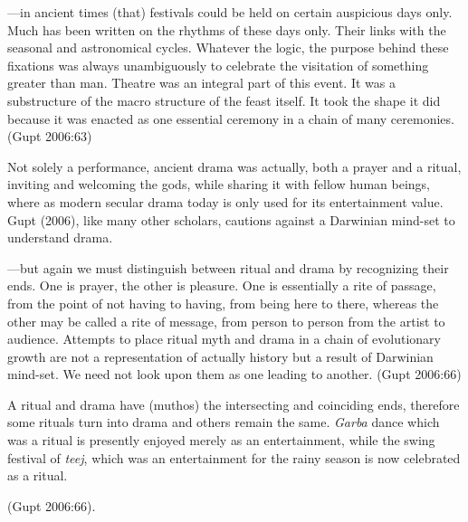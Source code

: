 \begin{myquote}
---in ancient times (that) festivals could be held on certain auspicious days only. Much has been written on the rhythms of these days only. Their links with the seasonal and astronomical cycles. Whatever the logic, the purpose behind these fixations was always unambiguously to celebrate the visitation of something greater than man. Theatre was an integral part of this event. It was a substructure of the macro structure of the feast itself. It took the shape it did because it was enacted as one essential ceremony in a chain of many ceremonies. 
\hfill (Gupt 2006:63)
\end{myquote}

Not solely a performance, ancient drama was actually, both a prayer and a ritual, inviting and welcoming the gods, while sharing it with fellow human beings, where as modern secular drama today is only used for its entertainment value. Gupt (2006), like many other scholars, cautions against a Darwinian mind-set to understand drama. 

\begin{myquote}
---but again we must distinguish between ritual and drama by recognizing their ends. One is prayer, the other is pleasure. One is essentially a rite of passage, from the point of not having to having, from being here to there, whereas the other may be called a rite of message, from person to person from the artist to audience. Attempts to place ritual myth and drama in a chain of evolutionary growth are not a representation of actually history but a result of Darwinian mind-set. We need not look upon them as one leading to another.
\hfill(Gupt 2006:66)
\end{myquote}

\begin{myquote}
A ritual and drama have (muthos) the intersecting and coinciding ends, therefore some rituals turn into drama and others remain the same. \textsl{Garba} dance which was a ritual is presently enjoyed merely as an entertainment, while the swing festival of \textsl{teej}, which was an entertainment for the rainy season is now celebrated as a ritual. 

\hfill(Gupt 2006:66).
\end{myquote}

